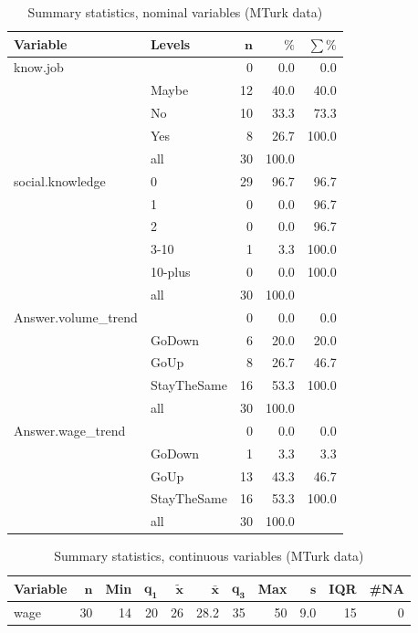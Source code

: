 \documentclass[a4paper,10pt]{article}\usepackage[]{graphicx}\usepackage[]{color}
\begin{document}
\begin{table}[ht]
\centering
{\footnotesize
\begin{tabular}{ll|rrr}
 \textbf{Variable} & \textbf{Levels} & $\mathbf{n}$ & $\mathbf{\%}$ & $\mathbf{\sum \%}$ \\ 
  \hline
know.job &  & 0 & 0.0 & 0.0 \\ 
   & Maybe & 12 & 40.0 & 40.0 \\ 
   & No & 10 & 33.3 & 73.3 \\ 
   & Yes & 8 & 26.7 & 100.0 \\ 
   \hline
 & all & 30 & 100.0 &  \\ 
   \hline
\hline
social.knowledge & 0 & 29 & 96.7 & 96.7 \\ 
   & 1 & 0 & 0.0 & 96.7 \\ 
   & 2 & 0 & 0.0 & 96.7 \\ 
   & 3-10 & 1 & 3.3 & 100.0 \\ 
   & 10-plus & 0 & 0.0 & 100.0 \\ 
   \hline
 & all & 30 & 100.0 &  \\ 
   \hline
\hline
Answer.volume\_trend &  & 0 & 0.0 & 0.0 \\ 
   & GoDown & 6 & 20.0 & 20.0 \\ 
   & GoUp & 8 & 26.7 & 46.7 \\ 
   & StayTheSame & 16 & 53.3 & 100.0 \\ 
   \hline
 & all & 30 & 100.0 &  \\ 
   \hline
\hline
Answer.wage\_trend &  & 0 & 0.0 & 0.0 \\ 
   & GoDown & 1 & 3.3 & 3.3 \\ 
   & GoUp & 13 & 43.3 & 46.7 \\ 
   & StayTheSame & 16 & 53.3 & 100.0 \\ 
   \hline
 & all & 30 & 100.0 &  \\ 
   \hline
\hline
\end{tabular}
}
\caption{Summary statistics, nominal variables (MTurk data)} 
\label{tab1:13-1110}
\end{table}
\begin{table}[ht]
\centering
{\footnotesize
\begin{tabular}{lrrrrrrrrrr}
 \textbf{Variable} & $\mathbf{n}$ & \textbf{Min} & $\mathbf{q_1}$ & $\mathbf{\widetilde{x}}$ & $\mathbf{\bar{x}}$ & $\mathbf{q_3}$ & \textbf{Max} & $\mathbf{s}$ & \textbf{IQR} & \textbf{\#NA} \\ 
  \hline
wage & 30 & 14 & 20 & 26 & 28.2 & 35 & 50 & 9.0 & 15 & 0 \\ 
  \end{tabular}
}
\caption{Summary statistics, continuous variables (MTurk data)} 
\label{tab2:13-1110}
\end{table}
\end{document}
